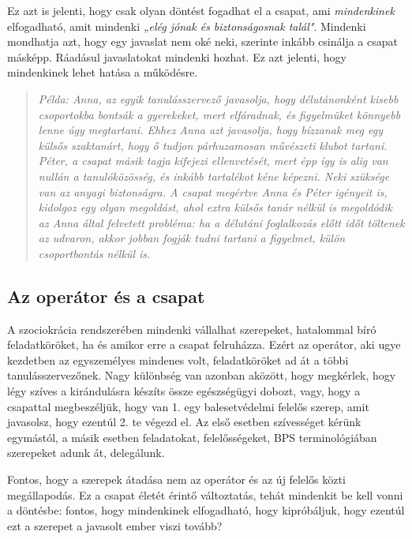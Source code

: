 Ez azt is jelenti, hogy csak olyan döntést fogadhat el a csapat, ami
\emph{mindenkinek} elfogadható, amit mindenki \emph{„elég jónak és
biztonságosnak talál"}. Mindenki mondhatja azt, hogy egy javaslat nem
oké neki, szerinte inkább csinálja a csapat másképp. Ráadásul
javaslatokat mindenki hozhat. Ez azt jelenti, hogy mindenkinek lehet
hatása a működésre.

\begin{quote}
\emph{Példa: Anna, az egyik tanulásszervező javasolja, hogy
délutánonként kisebb csoportokba bontsák a gyerekeket, mert elfáradnak,
és figyelmüket könnyebb lenne úgy megtartani. Ehhez Anna azt javasolja,
hogy bízzanak meg egy külsős szaktanárt, hogy ő tudjon párhuzamosan
művészeti klubot tartani. Péter, a csapat másik tagja kifejezi
ellenvetését, mert épp így is alig van nullán a tanulóközösség, és
inkább tartalékot kéne képezni. Neki szüksége van az anyagi biztonságra.
A csapat megértve Anna és Péter igényeit is, kidolgoz egy olyan
megoldást, ahol extra külsős tanár nélkül is megoldódik az Anna által
felvetett probléma: ha a délutáni foglalkozás előtt időt töltenek az
udvaron, akkor jobban fogják tudni tartani a figyelmet, külön
csoportbontás nélkül is.}
\end{quote}

\hypertarget{az-operator-es-a-csapat}{%
\subsection{Az operátor és a csapat}\label{az-operator-es-a-csapat}}

A szociokrácia rendszerében mindenki vállalhat szerepeket, hatalommal
bíró feladatköröket, ha és amikor erre a csapat felruházza. Ezért az
operátor, aki ugye kezdetben az egyszemélyes mindenes volt,
feladatköröket ad át a többi tanulásszervezőnek. Nagy különbség van
azonban aközött, hogy megkérlek, hogy légy szíves a kirándulásra készíts
össze egészségügyi dobozt, vagy, hogy a csapattal megbeszéljük, hogy van
1. egy balesetvédelmi felelős szerep, amit javasolsz, hogy ezentúl 2. te
végezd el. Az első esetben szívességet kérünk egymástól, a másik esetben
feladatokat, felelősségeket, BPS terminológiában szerepeket adunk át,
delegálunk.

Fontos, hogy a szerepek átadása nem az operátor és az új felelős közti
megállapodás. Ez a csapat életét érintő változtatás, tehát mindenkit be
kell vonni a döntésbe: fontos, hogy mindenkinek elfogadható, hogy
kipróbáljuk, hogy ezentúl ezt a szerepet a javasolt ember viszi tovább?

